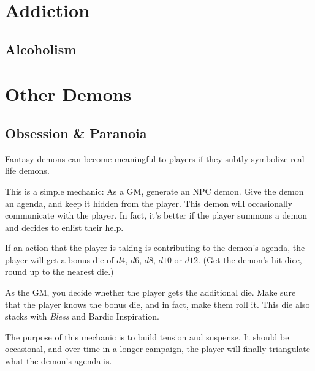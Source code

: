 \documentclass[twocolumn]{dndbook}
\begin{document}
\section{Addiction}
\subsection{Alcoholism}

\section{Other Demons}
\subsection{Obsession \& Paranoia}


\begin{emphasisParagraph}
	Fantasy demons can become meaningful to players if they subtly symbolize real life demons.
\end{emphasisParagraph}

This is a simple mechanic: As a GM, generate an NPC demon.
Give the demon an agenda, and keep it hidden from the player.
This demon will occasionally communicate with the player.
In fact, it's better if the player summons a demon and decides to enlist their help.\par

If an action that the player is taking is contributing to the demon's agenda, the player will get a bonus die of $d4$, $d6$, $d8$, $d10$ or $d12$.
(Get the demon's hit dice, round up to the nearest die.)\par
As the GM, you decide whether the player gets the additional die. Make sure that the player knows the bonus die, and in fact, make them roll it.
This die also stacks with \emph{Bless} and Bardic Inspiration.\par

The purpose of this mechanic is to build tension and suspense. It should be occasional, and over time in a longer campaign, the player will finally triangulate what the demon's agenda is.\par
\end{document}
